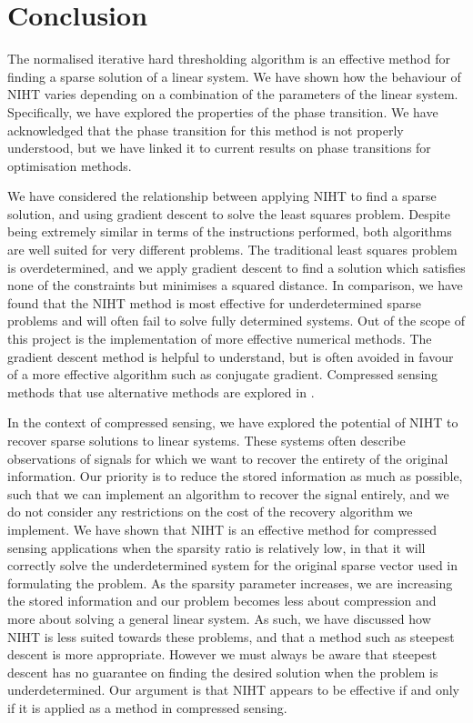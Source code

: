 \documentclass{article}
\begin{document}
\section{Conclusion}

The normalised iterative hard thresholding algorithm is an effective method for finding a sparse solution of a linear system.
We have shown how the behaviour of NIHT varies depending on a combination of the parameters of the linear system.
Specifically, we have explored the properties of the phase transition.
We have acknowledged that the phase transition for this method is not properly understood, but we have linked it to current results on phase transitions for optimisation methods.

We have considered the relationship between applying NIHT to find a sparse solution, and using gradient descent to solve the least squares problem.
Despite being extremely similar in terms of the instructions performed, both algorithms are well suited for very different problems.
The traditional least squares problem is overdetermined, and we apply gradient descent to find a solution which satisfies none of the constraints but minimises a squared distance.
In comparison, we have found that the NIHT method is most effective for underdetermined sparse problems and will often fail to solve fully determined systems.
Out of the scope of this project is the implementation of more effective numerical methods.
The gradient descent method is helpful to understand, but is often avoided in favour of a more effective algorithm such as conjugate gradient.
Compressed sensing methods that use alternative methods are explored in \cite{blanchard2013gpu}.

In the context of compressed sensing, we have explored the potential of NIHT to recover sparse solutions to linear systems.
These systems often describe observations of signals for which we want to recover the entirety of the original information.
Our priority is to reduce the stored information as much as possible, such that we can implement an algorithm to recover the signal entirely,
and we do not consider any restrictions on the cost of the recovery algorithm we implement.
We have shown that NIHT is an effective method for compressed sensing applications when the sparsity ratio is relatively low,
in that it will correctly solve the underdetermined system for the original sparse vector used in formulating the problem.
As the sparsity parameter increases, we are increasing the stored information and our problem becomes less about compression and more about solving a general linear system.
As such, we have discussed how NIHT is less suited towards these problems, and that a method such as steepest descent is more appropriate.
However we must always be aware that steepest descent has no guarantee on finding the desired solution when the problem is underdetermined.
Our argument is that NIHT appears to be effective if and only if it is applied as a method in compressed sensing.
\end{document}
